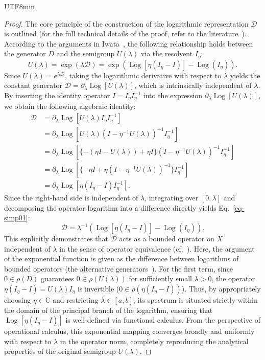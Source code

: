 \documentclass[10pt,a4paper]{article}
\theoremstyle{definition}
\theoremstyle{remark}
\begin{document}
\begin{CJK}{UTF8}{min}
\begin{proof}
The core principle of the construction of the logarithmic representation $\mathcal{D}$ is outlined (for the full technical details of the proof, refer to the literature~\cite{20iwata, 23iwata, 25iwata_kyoto}).
According to the arguments in Iwata~\cite{20iwata, 23iwata, 25iwata_kyoto}, the following relationship holds between the generator $D$ and the semigroup $U(\lambda)$ via the resolvent $I_{\eta}$:
\[
U(\lambda) 
= \exp(\lambda \mathcal{D})
= \exp \left( \operatorname{Log}[\eta(I_{\eta}-I)] - \operatorname{Log}(I_{\eta}) \right).
\]
Since $U(\lambda) = e^{\lambda \mathcal{D}}$, taking the logarithmic derivative with respect to $\lambda$ yields the constant generator $\mathcal{D} = \partial_{\lambda} \operatorname{Log}[U(\lambda)]$, which is intrinsically independent of $\lambda$. 
By inserting the identity operator $I = I_{\eta} I_{\eta}^{-1}$ into the expression $\partial_{\lambda} \operatorname{Log}[U(\lambda)]$, we obtain the following algebraic identity:
\begin{align*}
\mathcal{D} 
&= \partial_{\lambda} \operatorname{Log}[ U(\lambda) I_{\eta} I_{\eta}^{-1} ] \\
&= \partial_{\lambda} \operatorname{Log}[ U(\lambda) (I - \eta^{-1} U(\lambda))^{-1} I_{\eta}^{-1} ] \\
&= \partial_{\lambda} \operatorname{Log}[ \{ -(\eta I - U(\lambda)) + \eta I \} (I - \eta^{-1} U(\lambda))^{-1} I_{\eta}^{-1} ] \\
&= \partial_{\lambda} \operatorname{Log}[ \{ -\eta I + \eta (I - \eta^{-1} U(\lambda))^{-1} \} I_{\eta}^{-1} ] \\
&= \partial_{\lambda} \operatorname{Log}[ \eta (I_{\eta} - I) I_{\eta}^{-1} ].
\end{align*}
Since the right-hand side is independent of $\lambda$, integrating over $[0, \lambda]$ and decomposing the operator logarithm into a difference directly yields Eq.~\eqref{eq-simp01}:
\[
\mathcal{D} = \lambda^{-1} \left( \operatorname{Log}[\eta(I_{\eta}-I)] - \operatorname{Log}(I_{\eta}) \right).
\]
This explicitly demonstrates that $\mathcal{D}$ acts as a bounded operator on $X$ independent of $\lambda$ in the sense of operator equivalence (cf.~\cite{25iwata_kyoto}).
Here, the argument of the exponential function is given as the difference between logarithms of bounded operators (the alternative generators~\cite{17iwata-3}).
For the first term, since $0 \in \rho(D)$ guarantees $0 \in \rho(U(\lambda))$ for sufficiently small $\lambda > 0$, the operator $\eta(I_{\eta}-I) = U(\lambda) I_{\eta}$ is invertible ($0 \in \rho(\eta(I_{\eta}-I))$). 
Thus, by appropriately choosing $\eta \in \mathbb{C}$ and restricting $\lambda \in [a, b]$, its spectrum is situated strictly within the domain of the principal branch of the logarithm, ensuring that $\operatorname{Log}[\eta(I_{\eta}-I)]$ is well-defined via functional calculus.
From the perspective of operational calculus, this exponential mapping converges broadly and uniformly with respect to $\lambda$ in the operator norm, completely reproducing the analytical properties of the original semigroup $U(\lambda)$.
\end{proof}


\end{CJK}
\end{document}
